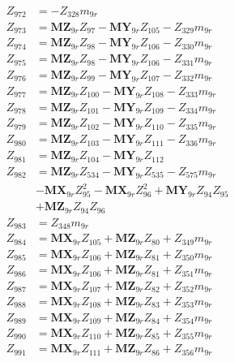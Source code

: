 \begin{multicols}{2}
\begin{align}
Z_{972} &= -Z_{328}m_{9r} \nonumber \\
Z_{973} &= \mathbf{MZ}_{9r}Z_{97} - \mathbf{MY}_{9r}Z_{105} - Z_{329}m_{9r} \nonumber \\
Z_{974} &= \mathbf{MZ}_{9r}Z_{98} - \mathbf{MY}_{9r}Z_{106} - Z_{330}m_{9r} \nonumber \\
Z_{975} &= \mathbf{MZ}_{9r}Z_{98} - \mathbf{MY}_{9r}Z_{106} - Z_{331}m_{9r} \nonumber \\
Z_{976} &= \mathbf{MZ}_{9r}Z_{99} - \mathbf{MY}_{9r}Z_{107} - Z_{332}m_{9r} \nonumber \\
Z_{977} &= \mathbf{MZ}_{9r}Z_{100} - \mathbf{MY}_{9r}Z_{108} - Z_{333}m_{9r} \nonumber \\
Z_{978} &= \mathbf{MZ}_{9r}Z_{101} - \mathbf{MY}_{9r}Z_{109} - Z_{334}m_{9r} \nonumber \\
Z_{979} &= \mathbf{MZ}_{9r}Z_{102} - \mathbf{MY}_{9r}Z_{110} - Z_{335}m_{9r} \nonumber \\
Z_{980} &= \mathbf{MZ}_{9r}Z_{103} - \mathbf{MY}_{9r}Z_{111} - Z_{336}m_{9r} \nonumber \\
Z_{981} &= \mathbf{MZ}_{9r}Z_{104} - \mathbf{MY}_{9r}Z_{112} \nonumber \\
Z_{982} &= \mathbf{MZ}_{9r}Z_{534} - \mathbf{MY}_{9r}Z_{535} - Z_{575}m_{9r}  \nonumber \\
&- \mathbf{MX}_{9r}Z_{95}^2 - \mathbf{MX}_{9r}Z_{96}^2 + \mathbf{MY}_{9r}Z_{94}Z_{95}  \nonumber \\
&+ \mathbf{MZ}_{9r}Z_{94}Z_{96} \nonumber \\
Z_{983} &= Z_{348}m_{9r} \nonumber \\
Z_{984} &= \mathbf{MX}_{9r}Z_{105} + \mathbf{MZ}_{9r}Z_{80} + Z_{349}m_{9r} \nonumber \\
Z_{985} &= \mathbf{MX}_{9r}Z_{106} + \mathbf{MZ}_{9r}Z_{81} + Z_{350}m_{9r} \nonumber \\
Z_{986} &= \mathbf{MX}_{9r}Z_{106} + \mathbf{MZ}_{9r}Z_{81} + Z_{351}m_{9r} \nonumber \\
Z_{987} &= \mathbf{MX}_{9r}Z_{107} + \mathbf{MZ}_{9r}Z_{82} + Z_{352}m_{9r} \nonumber \\
Z_{988} &= \mathbf{MX}_{9r}Z_{108} + \mathbf{MZ}_{9r}Z_{83} + Z_{353}m_{9r} \nonumber \\
Z_{989} &= \mathbf{MX}_{9r}Z_{109} + \mathbf{MZ}_{9r}Z_{84} + Z_{354}m_{9r} \nonumber \\
Z_{990} &= \mathbf{MX}_{9r}Z_{110} + \mathbf{MZ}_{9r}Z_{85} + Z_{355}m_{9r} \nonumber \\
Z_{991} &= \mathbf{MX}_{9r}Z_{111} + \mathbf{MZ}_{9r}Z_{86} + Z_{356}m_{9r} \nonumber \\

\end{align}
\end{multicols}
